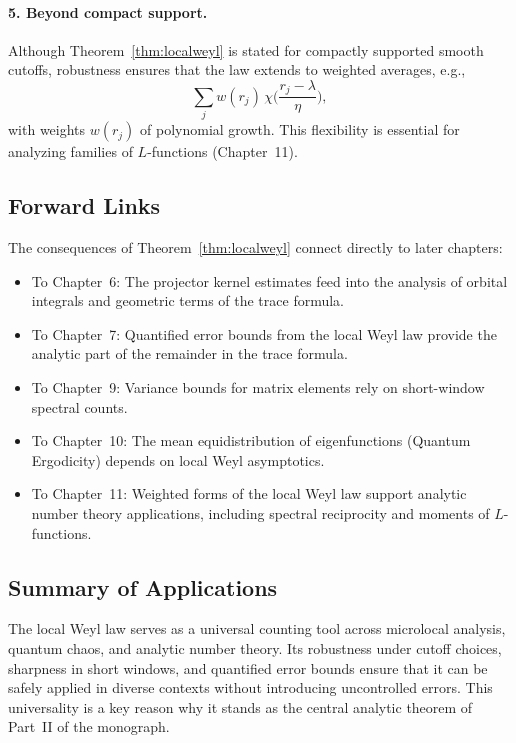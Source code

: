 \paragraph{5. Beyond compact support.}
Although Theorem~\ref{thm:localweyl} is stated for compactly supported smooth cutoffs, robustness ensures that the law extends to weighted averages, e.g.,
\[
\sum_j w(r_j)\,\chi\!\Big(\frac{r_j-\lambda}{\eta}\Big),
\]
with weights $w(r_j)$ of polynomial growth.  
This flexibility is essential for analyzing families of $L$-functions (Chapter~11).

\subsection{Forward Links}

The consequences of Theorem~\ref{thm:localweyl} connect directly to later chapters:

\begin{itemize}
  \item To Chapter~6: The projector kernel estimates feed into the analysis of orbital integrals and geometric terms of the trace formula.
  \item To Chapter~7: Quantified error bounds from the local Weyl law provide the analytic part of the remainder in the trace formula.
  \item To Chapter~9: Variance bounds for matrix elements rely on short-window spectral counts.
  \item To Chapter~10: The mean equidistribution of eigenfunctions (Quantum Ergodicity) depends on local Weyl asymptotics.
  \item To Chapter~11: Weighted forms of the local Weyl law support analytic number theory applications, including spectral reciprocity and moments of $L$-functions.
\end{itemize}

\subsection{Summary of Applications}

The local Weyl law serves as a universal counting tool across microlocal analysis, quantum chaos, and analytic number theory.  
Its robustness under cutoff choices, sharpness in short windows, and quantified error bounds ensure that it can be safely applied in diverse contexts without introducing uncontrolled errors.  
This universality is a key reason why it stands as the central analytic theorem of Part~II of the monograph.

